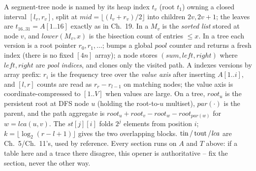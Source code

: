 A segment-tree node is named by its heap index \(t_v\) (root \(t_1\)) owning a
closed interval \([l_v,r_v]\), split at \(\mathit{mid}=\lfloor(l_v{+}r_v)/2\rfloor\)
into children \(2v,2v{+}1\); the leaves are \(t_{16..31}=A[1..16]\) exactly as
in Ch.~19.  In a  \(M_v\) is the \emph{sorted list} stored
at node \(v\), and \(\mathit{lower}(M_v,x)\) is the bisection count of entries
\(\le x\).  In a  tree each version is a root pointer
\(r_0,r_1,\dots\);  bumps a global \(\mathit{pool}\) counter and
returns a fresh index (there is no fixed \([4n]\) array); a node stores
\((\mathit{sum},\mathit{left},\mathit{right})\) where \(\mathit{left},\mathit{right}\)
are \emph{pool indices}, and  clones only the visited path.
A  indexes versions by array prefix: \(r_i\) is the
frequency tree over the \emph{value axis} after inserting \(A[1..i]\), and
\([l,r]\) counts are read as \(r_r - r_{l-1}\) on matching nodes; the value
axis is coordinate-compressed to \([1..V]\) when values are large.  On a tree,
\(\mathit{root}_u\) is the persistent root at DFS node \(u\) (holding the
root-to-\(u\) multiset), \(\mathit{par}(\cdot)\) is the parent, and the path
aggregate is \(\mathit{root}_u+\mathit{root}_v-\mathit{root}_w-\mathit{root}_{\mathit{par}(w)}\)
for \(w=\mathit{lca}(u,v)\).  The  \(\mathit{st}[j][i]\)
folds \(2^j\) elements from position \(i\); \(k=\lfloor\log_2(r-l+1)\rfloor\)
gives the two overlapping blocks.  \(\operatorname{tin}/\operatorname{tout}/\mathit{lca}\) are Ch.~5/Ch.~11's,
used by reference.  Every section runs on \(A\) and \(T\) above: if a table here
and a trace there disagree, this opener is authoritative -- fix the section,
never the other way.
